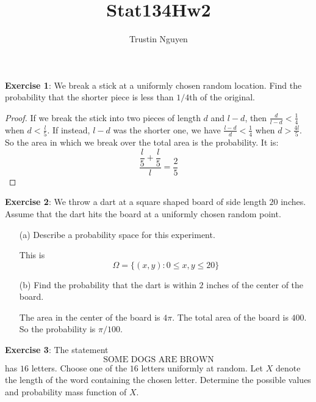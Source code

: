 \documentclass{article}
\title{Stat134Hw2}
\author{Trustin Nguyen}
\begin{document}
    \maketitle

\reversemarginpar

\textbf{Exercise 1}: We break a stick at a uniformly chosen random location. Find the probability that the shorter piece is less than $1/4$th of the original.
    \begin{proof}
        If we break the stick into two pieces of length $d$ and $l - d$, then $\frac{d}{l - d} < \frac{1}{4}$ when $d < \frac{l}{5}$. If instead, $l - d$ was the shorter one, we have $\frac{l - d}{d} < \frac{1}{4}$ when $d > \frac{4l}{5}$. So the area in which we break over the total area is the probability. It is:
            \begin{equation*}
                \dfrac{\dfrac{l}{5} + \dfrac{l}{5}}{l} = \dfrac{2}{5}
            \end{equation*}
    \end{proof}

\textbf{Exercise 2}: We throw a dart at a square shaped board of side length $20$ inches. 
Assume that the dart hits the board at a uniformly chosen random point.
    \begin{itemize}
        \item [(a)] Describe a probability space for this experiment.
            \begin{answer}
                This is 
                    \begin{equation*}
                        \Omega = \{(x, y) : 0 \leq x, y \leq 20\}
                    \end{equation*}
            \end{answer}

        \item [(b)] Find the probability that the dart is within $2$ inches of the center of the board. 
            \begin{answer}
                The area in the center of the board is $4\pi$. The total area of the board is $400$. So the probability is $\pi/100$.
            \end{answer}
    \end{itemize}

\textbf{Exercise 3}: The statement 
    \begin{equation*}
        \text{SOME DOGS ARE BROWN}
    \end{equation*}
has $16$ letters. Choose one of the $16$ letters uniformly at random. Let $X$ denote the length of the word containing the chosen letter. Determine the possible values and probability mass function of $X$.
    \begin{answer}
        
    \end{answer}
\end{document}

